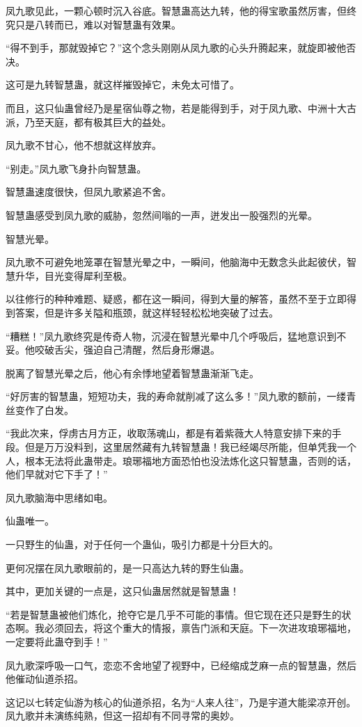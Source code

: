 \begin{this_body}
凤九歌见此，一颗心顿时沉入谷底。智慧蛊高达九转，他的得宝歌虽然厉害，但终究只是八转而已，难以对智慧蛊有效果。

“得不到手，那就毁掉它？”这个念头刚刚从凤九歌的心头升腾起来，就旋即被他否决。

这可是九转智慧蛊，就这样摧毁掉它，未免太可惜了。

而且，这只仙蛊曾经乃是星宿仙尊之物，若是能得到手，对于凤九歌、中洲十大古派，乃至天庭，都有极其巨大的益处。

凤九歌不甘心，他不想就这样放弃。

“别走。”凤九歌飞身扑向智慧蛊。

智慧蛊速度很快，但凤九歌紧追不舍。

智慧蛊感受到凤九歌的威胁，忽然间嗡的一声，迸发出一股强烈的光晕。

智慧光晕。

凤九歌不可避免地笼罩在智慧光晕之中，一瞬间，他脑海中无数念头此起彼伏，智慧升华，目光变得犀利至极。

以往修行的种种难题、疑惑，都在这一瞬间，得到大量的解答，虽然不至于立即得到答案，但是许多关隘和瓶颈，就这样轻轻松松地突破了过去。

“糟糕！”凤九歌终究是传奇人物，沉浸在智慧光晕中几个呼吸后，猛地意识到不妥。他咬破舌尖，强迫自己清醒，然后身形爆退。

脱离了智慧光晕之后，他心有余悸地望着智慧蛊渐渐飞走。

“好厉害的智慧蛊，短短功夫，我的寿命就削减了这么多！”凤九歌的额前，一缕青丝变作了白发。

“我此次来，俘虏古月方正，收取荡魂山，都是有着紫薇大人特意安排下来的手段。但是万万没料到，这里居然藏有九转智慧蛊！我已经竭尽所能，但单凭我一个人，根本无法将此蛊带走。琅琊福地方面恐怕也没法炼化这只智慧蛊，否则的话，他们早就对它下手了！”

凤九歌脑海中思绪如电。

仙蛊唯一。

一只野生的仙蛊，对于任何一个蛊仙，吸引力都是十分巨大的。

更何况摆在凤九歌眼前的，是一只高达九转的野生仙蛊。

其中，更加关键的一点是，这只仙蛊居然就是智慧蛊！

“若是智慧蛊被他们炼化，抢夺它是几乎不可能的事情。但它现在还只是野生的状态啊。我必须回去，将这个重大的情报，禀告门派和天庭。下一次进攻琅琊福地，一定要将此蛊夺到手！”

凤九歌深呼吸一口气，恋恋不舍地望了视野中，已经缩成芝麻一点的智慧蛊，然后他催动仙道杀招。

这记以七转定仙游为核心的仙道杀招，名为“人来人往”，乃是宇道大能梁凉开创。凤九歌并未演练纯熟，但这一招却有不同寻常的奥妙。


\end{this_body}
